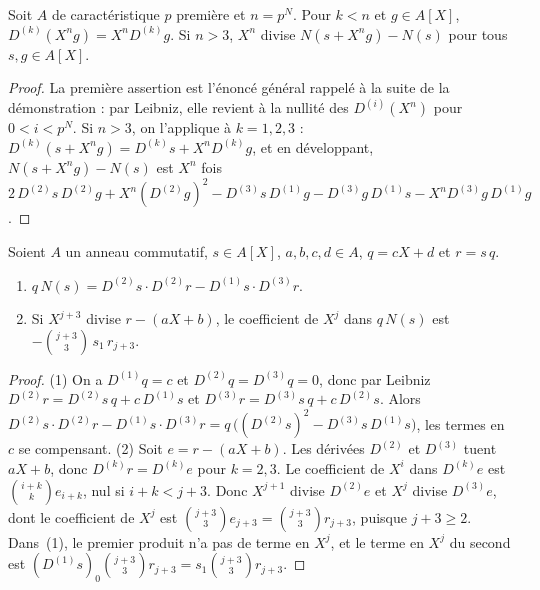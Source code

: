 \begin{lemme}\label{lem:93-tronque}
Soit $A$ de caractéristique $p$ première et $n = p^N$. Pour $k < n$ et $g \in A[X]$, $D^{(k)}(X^n g) = X^n D^{(k)} g$. Si $n > 3$, $X^n$ divise $N(s + X^n g) - N(s)$ pour tous $s, g \in A[X]$.
\end{lemme}

\begin{proof}
La première assertion est l'énoncé général rappelé à la suite de la démonstration : par Leibniz, elle revient à la nullité des $D^{(i)}(X^n)$ pour $0 < i < p^N$. Si $n > 3$, on l'applique à $k = 1, 2, 3$ : $D^{(k)}(s + X^n g) = D^{(k)} s + X^n D^{(k)} g$, et en développant, $N(s + X^n g) - N(s)$ est $X^n$ fois $2\,D^{(2)}s\,D^{(2)}g + X^n (D^{(2)}g)^2 - D^{(3)}s\,D^{(1)}g - D^{(3)}g\,D^{(1)}s - X^n D^{(3)}g\,D^{(1)}g$.
\end{proof}

\begin{enonce}
Soient $A$ un anneau commutatif, $s \in A[X]$, $a, b, c, d \in A$, $q = cX + d$ et $r = s\,q$.
\begin{enumerate}
\item $q\,N(s) = D^{(2)} s \cdot D^{(2)} r - D^{(1)} s \cdot D^{(3)} r$.
\item Si $X^{j+3}$ divise $r - (aX + b)$, le coefficient de $X^j$ dans $q\,N(s)$ est $-\binom{j+3}{3}\, s_1\, r_{j+3}$.
\end{enumerate}
\end{enonce}

\begin{proof}
(1) On a $D^{(1)} q = c$ et $D^{(2)} q = D^{(3)} q = 0$, donc par Leibniz $D^{(2)} r = D^{(2)}s\,q + c\,D^{(1)}s$ et $D^{(3)} r = D^{(3)}s\,q + c\,D^{(2)}s$. Alors $D^{(2)} s \cdot D^{(2)} r - D^{(1)} s \cdot D^{(3)} r = q\,\bigl((D^{(2)}s)^2 - D^{(3)}s\,D^{(1)}s\bigr)$, les termes en $c$ se compensant. (2) Soit $e = r - (aX + b)$. Les dérivées $D^{(2)}$ et $D^{(3)}$ tuent $aX + b$, donc $D^{(k)} r = D^{(k)} e$ pour $k = 2, 3$. Le coefficient de $X^i$ dans $D^{(k)} e$ est $\binom{i+k}{k} e_{i+k}$, nul si $i + k < j + 3$. Donc $X^{j+1}$ divise $D^{(2)} e$ et $X^j$ divise $D^{(3)} e$, dont le coefficient de $X^j$ est $\binom{j+3}{3} e_{j+3} = \binom{j+3}{3} r_{j+3}$, puisque $j + 3 \geq 2$. Dans~(1), le premier produit n'a pas de terme en $X^j$, et le terme en $X^j$ du second est $(D^{(1)}s)_0 \binom{j+3}{3} r_{j+3} = s_1 \binom{j+3}{3} r_{j+3}$.
\end{proof}

